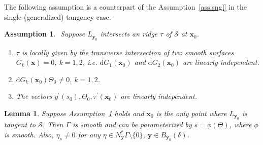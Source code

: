 \documentclass[11pt]{article}
\newcommand{\jc}[1]{\begin{quotation}\textbf{James' comment:\
}{\textit{#1}}\end{quotation}}
\newcommand{\s}{\mathcal S}
\newcommand{\ed}{\tau}
\newcommand{\dd}{\mathrm{d}}
\newcommand{\de}{\delta}
\numberwithin{equation}{section}
\newcommand{\vy}{\mathbf{y}}
\newcommand{\vx}{\mathbf{x}}
\newtheorem{lemma}[theorem]{Lemma}
\newtheorem{assumption}[theorem]{Assumption}
\theoremstyle{definition}
\begin{document}
The following assumption is a counterpart of the Assumption~\ref{ass:sngl} in the single (generalized) tangency case.

\begin{assumption}\label{ass:edge}$ $
Suppose $L_{\vy_0}$ intersects an ridge $\ed$ of $\s$ at $\vx_0$.
\begin{enumerate}
\item\label{transv int} $\tau$ is locally given by the transverse intersection of two smooth surfaces $G_k(\vx)=0$, $k=1,2$, i.e. $\dd G_1(\vx_0)$ and $\dd G_2(\vx_0)$ are linearly independent.
\item\label{GTheta} $\dd G_k(\vx_0)\Theta_0\neq0$, $k=1,2$.
\item\label{lin indep 3} The vectors $y^\prime(s_0),\Theta_0,\ed^\prime(\vx_0)$ are linearly independent.
\end{enumerate}
\end{assumption}


\begin{lemma}\label{lem:Gamma edge} Suppose Assumption~\ref{ass:edge} holds  and $\vx_0$ is the only point where $L_{\vy_0}$ is tangent to $\s$. Then $\Gamma$ is smooth and can be parameterized by $s = \phi(\Theta)$, where $\phi$ is smooth. Also, $\eta_s\neq0$ for any $\eta\in N_{\vy}^*\Gamma\setminus\{0\}$, $\vy\in B_{\vy_0}(\de)$.
\end{lemma}
\end{document}

